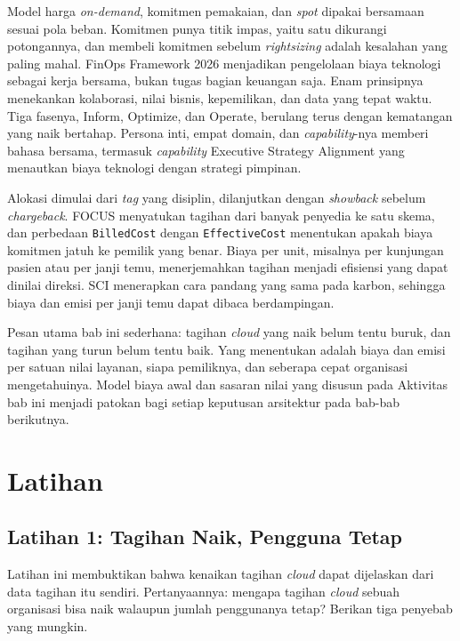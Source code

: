 Model harga \textit{on-demand}, komitmen pemakaian, dan \textit{spot} dipakai bersamaan sesuai pola
beban. Komitmen punya titik impas, yaitu satu dikurangi potongannya, dan membeli komitmen sebelum
\textit{rightsizing} adalah kesalahan yang paling mahal. FinOps Framework 2026 menjadikan
pengelolaan biaya teknologi sebagai kerja bersama, bukan tugas bagian keuangan saja. Enam prinsipnya
menekankan kolaborasi, nilai bisnis, kepemilikan, dan data yang tepat waktu. Tiga fasenya, Inform,
Optimize, dan Operate, berulang terus dengan kematangan yang naik bertahap. Persona inti, empat
domain, dan \textit{capability}-nya memberi bahasa bersama, termasuk \textit{capability} Executive
Strategy Alignment yang menautkan biaya teknologi dengan strategi pimpinan.

Alokasi dimulai dari \textit{tag} yang disiplin, dilanjutkan dengan \textit{showback} sebelum
\textit{chargeback}. FOCUS menyatukan tagihan dari banyak penyedia ke satu skema, dan perbedaan
\texttt{BilledCost} dengan \texttt{EffectiveCost} menentukan apakah biaya komitmen jatuh ke pemilik
yang benar. Biaya per unit, misalnya per kunjungan pasien atau per janji temu, menerjemahkan tagihan
menjadi efisiensi yang dapat dinilai direksi. SCI menerapkan cara pandang yang sama pada karbon,
sehingga biaya dan emisi per janji temu dapat dibaca berdampingan.

Pesan utama bab ini sederhana: tagihan \textit{cloud} yang naik belum tentu buruk, dan tagihan yang
turun belum tentu baik. Yang menentukan adalah biaya dan emisi per satuan nilai layanan, siapa
pemiliknya, dan seberapa cepat organisasi mengetahuinya. Model biaya awal dan sasaran nilai yang
disusun pada Aktivitas bab ini menjadi patokan bagi setiap keputusan arsitektur pada bab-bab
berikutnya.

\section{Latihan}

\subsection*{Latihan 1: Tagihan Naik, Pengguna Tetap}

Latihan ini membuktikan bahwa kenaikan tagihan \textit{cloud} dapat dijelaskan dari data tagihan itu
sendiri. Pertanyaannya: mengapa tagihan \textit{cloud} sebuah organisasi bisa naik walaupun jumlah
penggunanya tetap? Berikan tiga penyebab yang mungkin.

